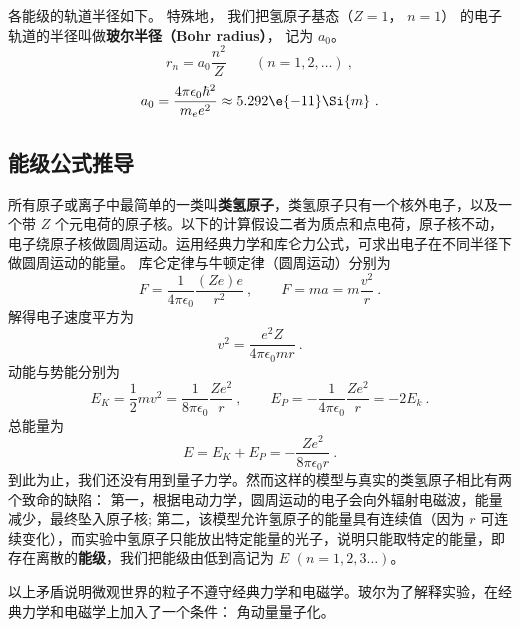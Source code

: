 各能级的轨道半径如下。 特殊地， 我们把氢原子基态（$Z = 1$， $n = 1$） 的电子轨道的半径叫做\textbf{玻尔半径（Bohr radius）}， 记为 $a_0$。
\begin{equation}\label{eq_BohrMd_1}
r_n = a_0 \frac{n^2}{Z}
\qquad (n = 1, 2, \dots)~,
\end{equation}
\begin{equation}\label{eq_BohrMd_3}
a_0 = \frac{4\pi \epsilon_0 \hbar^2}{m_e e^2} \approx 5.292\e{-11}\Si{m}~.
\end{equation}


\subsection{能级公式推导}
所有原子或离子中最简单的一类叫\textbf{类氢原子}，类氢原子只有一个核外电子，以及一个带 $Z$ 个元电荷的原子核。以下的计算假设二者为质点和点电荷，原子核不动，电子绕原子核做圆周运动。运用经典力学和库仑力公式，可求出电子在不同半径下做圆周运动的能量。 库仑定律与牛顿定律（圆周运动）分别为
\begin{equation}
F = \frac{1}{4\pi \epsilon_0} \frac{(Ze)e}{r^2}~,
\qquad
F = ma = m\frac{v^2}{r}~.
\end{equation}
解得电子速度平方为
\begin{equation}\label{eq_BohrMd_2}
v^2 = \frac{e^2 Z}{4\pi \epsilon_0 mr}~.
\end{equation}
动能与势能分别为
\begin{equation}
E_K = \frac12 m v^2 = \frac{1}{8\pi\epsilon_0} \frac{Z e^2}{r}~,
\qquad
E_P =  -\frac{1}{4\pi\epsilon_0} \frac{Ze^2}{r} = -2 E_k~.
\end{equation}   
总能量为
\begin{equation}\label{eq_BohrMd_4}
E = E_K + E_P =  -\frac{Z e^2}{8\pi\epsilon_0 r}~.
\end{equation}
到此为止，我们还没有用到量子力学。然而这样的模型与真实的类氢原子相比有两个致命的缺陷： 第一，根据电动力学，圆周运动的电子会向外辐射电磁波，能量减少，最终坠入原子核; 第二，该模型允许氢原子的能量具有连续值（因为 $r$ 可连续变化），而实验中氢原子只能放出特定能量的光子，说明只能取特定的能量，即存在离散的\textbf{能级}，我们把能级由低到高记为 $E$  $(n = 1,2,3\dots)$。 

以上矛盾说明微观世界的粒子不遵守经典力学和电磁学。玻尔为了解释实验，在经典力学和电磁学上加入了一个条件： 角动量量子化。

